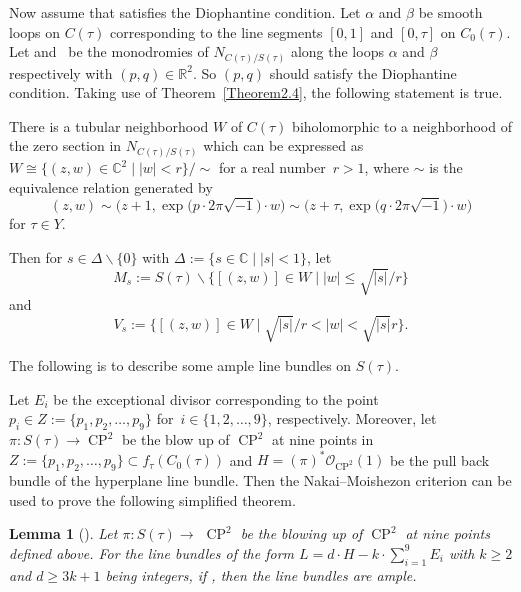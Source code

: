 \documentclass[pdftex]{sigma}
\numberwithin{equation}{section}
\newtheorem{Lemma}[Theorem]{Lemma}
\begin{document}
Now assume that  satisfies the Diophantine condition. Let $\alpha$ and $\beta$ be smooth loops on $C(\tau)$ corresponding to the line segments $[0,1]$ and $[0,\tau]$ on $C_0(\tau)$. Let  and~ be the monodromies of $N_{C(\tau)/S(\tau)}$ along the loops $\alpha$ and $\beta$ respectively with $(p,q)\in \mathbb{R}^2$. So $(p,q)$ should satisfy the Diophantine condition. Taking use of Theorem~\ref{Theorem2.4}, the following statement is true.

There is a tubular neighborhood $W$ of $C(\tau)$ biholomorphic to a neighborhood of the zero section in $N_{C(\tau)/S(\tau)}$ which can be expressed as
$
W \cong \bigl\{(z,w)\in \mathbb{C}^2\mid | w| <r \bigr\}/{\sim}$
for a real number~${r>1}$, where $\sim$ is the equivalence relation generated by
\[(z,w)\sim\bigl(z+1,\exp\bigl(p\cdot 2\pi \sqrt{-1}\bigr)\cdot w\bigr)\sim\bigl(z+\tau,\exp\bigl(q\cdot 2\pi \sqrt{-1}\bigr)\cdot w\bigr)\]
for $\tau\in Y$.

Then for $s\in \Delta\backslash \{0\}$ with $\Delta:=\{s\in \mathbb{C}\mid |s|<1\}$, let
\[M_s:=S(\tau)\backslash\bigl\{[(z,w)]\in W\mid |w| \leq \sqrt{|s|}/r\bigr\}\]
and
\[V_s:=\bigl\{[(z,w)]\in W\mid \sqrt{|s|}/r<|w|<\sqrt{|s|}r\bigr\}.\]

The following is to describe some ample line bundles on $S(\tau)$.

Let $E_i$ be the exceptional divisor corresponding to the point $p_i \in Z:= \{p_1, p_2, \dots , p_9 \}$ for~${i \in \{1, 2, \dots , 9 \}}$, respectively. Moreover, let $\pi\colon S(\tau)\rightarrow \operatorname{CP}^2$ be the blow up of $\operatorname{CP}^2$ at nine points in $Z:= \{p_1, p_2, \dots , p_9 \}\subset f_{\tau}(C_0(\tau))$ and $H=(\pi)^* \mathcal{O}_{\operatorname{CP}^2}(1)$ be the pull back bundle of the hyperplane line bundle. Then the Nakai--Moishezon criterion \cite[Appendix~A]{Robin} can be used to prove the following simplified theorem.

\begin{Lemma}[{\cite[Theorem~3]{Tomasz-Halszka}}] \label{Lemma2.5}
Let $\pi\colon S(\tau)\rightarrow$ \emph{$\operatorname{CP}^2$} be the blowing up of \emph{$\operatorname{CP}^2$} at nine points defined above. For the line bundles of the form $L=d\cdot H-k\cdot\sum _{i=1}^9 E_i$ with $k\geq2$ and $d\geq3k+1$ being integers, if , then the line bundles are ample.
\end{Lemma}
\end{document}
